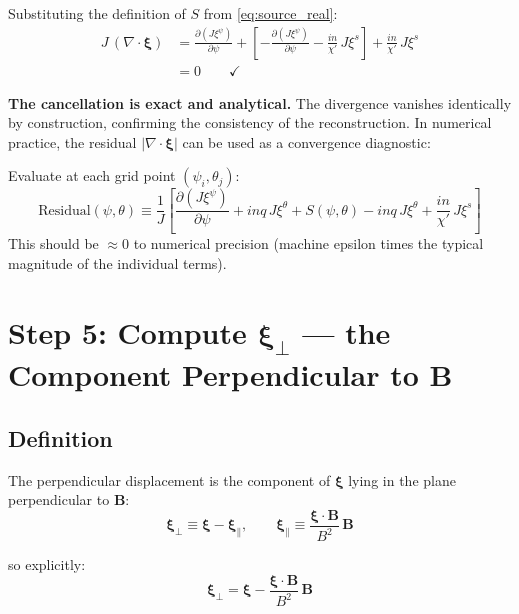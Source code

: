 \documentclass[12pt,a4paper]{article}
\newcommand{\bxi}{\boldsymbol{\xi}}
\begin{document}
Substituting the definition of $S$ from \eqref{eq:source_real}:
\begin{align}
    J\,(\nabla\cdot\bxi) &= \frac{\partial(J\xi^\psi)}{\partial\psi}
    + \left[-\frac{\partial(J\xi^\psi)}{\partial\psi} - \frac{in}{\chi'}\,J\xi^s\right]
    + \frac{in}{\chi'}\,J\xi^s \\[6pt]
    &= 0 \qquad \checkmark
    \label{eq:div_zero}
\end{align}

\textbf{The cancellation is exact and analytical.} The divergence vanishes identically by construction, confirming the consistency of the reconstruction. In numerical practice, the residual $|\nabla\cdot\bxi|$ can be used as a convergence diagnostic:

\begin{tcolorbox}[colback=green!5!white, colframe=green!60!black, title=\textbf{Numerical verification formula}]
Evaluate at each grid point $(\psi_i, \theta_j)$:
\begin{equation}
    \text{Residual}(\psi,\theta) \equiv
    \frac{1}{J}\left[
    \frac{\partial(J\xi^\psi)}{\partial\psi}
    + inq\,J\xi^\theta + S(\psi,\theta)
    - inq\,J\xi^\theta + \frac{in}{\chi'}\,J\xi^s
    \right]
\end{equation}
This should be $\approx 0$ to numerical precision (machine epsilon times the typical magnitude of the individual terms).
\end{tcolorbox}

\section{Step 5: Compute $\bxi_\perp$ --- the Component Perpendicular to $\mathbf{B}$}

\subsection{Definition}

The perpendicular displacement is the component of $\bxi$ lying in the plane perpendicular to $\mathbf{B}$:
\begin{equation}
    \bxi_\perp \equiv \bxi - \bxi_\parallel, \qquad \bxi_\parallel \equiv \frac{\bxi\cdot\mathbf{B}}{B^2}\,\mathbf{B}
    \label{eq:xiperp_def}
\end{equation}

so explicitly:
\begin{equation}
    \boxed{\bxi_\perp = \bxi - \frac{\bxi\cdot\mathbf{B}}{B^2}\,\mathbf{B}}
    \label{eq:xiperp}
\end{equation}
\end{document}

